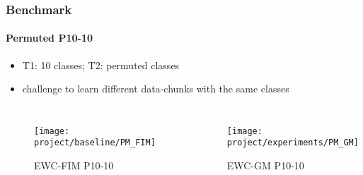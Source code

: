         \begin{frame}
            \frametitle{Benchmark}
            \framesubtitle{Permuted P10-10}

            \begin{itemize}
                \item T1: 10 classes; T2: permuted classes
                \item challenge to learn different data-chunks with the same classes
            \end{itemize}

            \begin{columns}
                \begin{figure}[H]
                    \centering
                    \texttt{[image: project/baseline/PM\_FIM]}
                    \caption{EWC-FIM P10-10}
                    \label{fig:ewc_fim_pm}
                \end{figure}
                \begin{figure}[H]
                    \centering
                    \texttt{[image: project/experiments/PM\_GM]}
                    \caption{EWC-GM P10-10}
                    \label{fig:ewc_gm_pm}
                \end{figure}
            \end{columns}
        \end{frame}